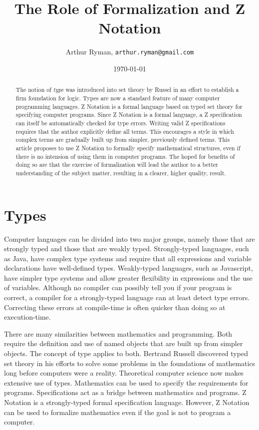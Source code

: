 \documentclass[11pt, oneside]{article}
\title{The Role of Formalization and Z Notation}
\author{Arthur Ryman, {\tt arthur.ryman@gmail.com}}
\date{\today}
\begin{document}
\maketitle

\begin{abstract}
The notion of {\it type} was introduced into set theory by Russel in an effort to establish a firm foundation for logic.
Types are now a standard feature of many computer programming languages.
Z Notation is a formal language based on typed set theory for specifying computer programs.
Since Z Notation is a formal language, a Z specification can itself be automatically checked for type errors.
Writing valid Z specifications requires that the author explicitly define all terms.
This encourages a style in which complex terms are gradually built up from simpler, previously defined terms.
This article proposes to use Z Notation to formally specify mathematical structures, even if there is no intension of using
them in computer programs.
The hoped for benefits of doing so are that the exercise of formalization will lead the author to a better understanding of the subject
matter, resulting in a clearer, higher quality, result.
\end{abstract}

\section{Types}

Computer languages can be divided into two major groups, namely those that are strongly typed and those that are weakly typed.
Strongly-typed languages, such as Java, have complex type systems and require that all expressions and variable declarations 
have well-defined types.
Weakly-typed languages, such as Javascript, have simpler type systems and allow greater flexibility in expressions and the use of variables.
Although no compiler can possibly tell you if your program is correct, a compiler for a strongly-typed language can at least detect type errors.
Correcting these errors at compile-time is often quicker than doing so at execution-time.

There are many similarities between mathematics and programming. 
Both require the definition and use of named objects that are built up from simpler objects.
The concept of type applies to both.
Bertrand Russell discovered typed set theory in his efforts to solve some problems in the foundations of mathematics 
long before computers were a reality.
Theoretical computer science now makes extensive use of types.
Mathematics can be used to specify the requirements for programs.
Specifications act as a bridge between mathematics and programs.
Z Notation is a strongly-typed formal specification language.
However, Z Notation can be used to formalize mathematics even if the goal is not to program a computer.
\end{document}
